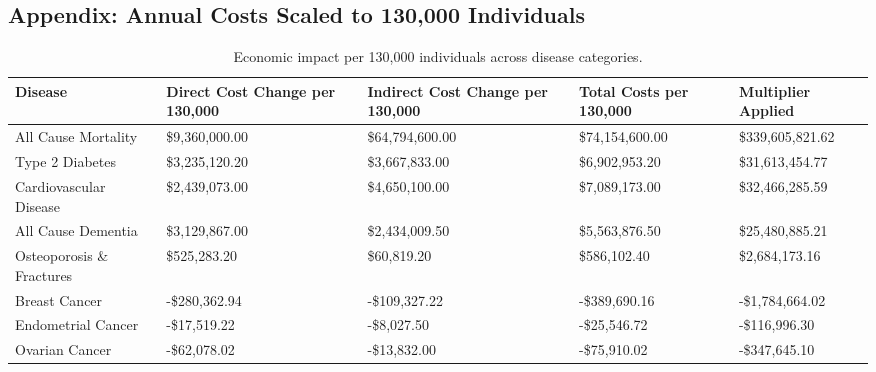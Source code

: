 \documentclass[12pt]{article}
\begin{document}
\begin{landscape}
\section*{Appendix: Annual Costs Scaled to 130,000 Individuals}
\begin{table}[h]
\centering
\small
\begin{tabular}{|p{3.5cm}|p{2.8cm}|p{2.8cm}|p{2.8cm}|p{3.2cm}|}
\hline
\textbf{Disease} & \textbf{Direct Cost Change per 130,000} & \textbf{Indirect Cost Change per 130,000} & \textbf{Total Costs per 130,000} & \textbf{Multiplier Applied} \\
\hline
All Cause Mortality & \$9,360,000.00 & \$64,794,600.00 & \$74,154,600.00 & \$339,605,821.62 \\
\hline
Type 2 Diabetes & \$3,235,120.20 & \$3,667,833.00 & \$6,902,953.20 & \$31,613,454.77 \\
\hline
Cardiovascular Disease & \$2,439,073.00 & \$4,650,100.00 & \$7,089,173.00 & \$32,466,285.59 \\
\hline
All Cause Dementia & \$3,129,867.00 & \$2,434,009.50 & \$5,563,876.50 & \$25,480,885.21 \\
\hline
Osteoporosis \& Fractures & \$525,283.20 & \$60,819.20 & \$586,102.40 & \$2,684,173.16 \\
\hline
Breast Cancer & -\$280,362.94 & -\$109,327.22 & -\$389,690.16 & -\$1,784,664.02 \\
\hline
Endometrial Cancer & -\$17,519.22 & -\$8,027.50 & -\$25,546.72 & -\$116,996.30 \\
\hline
Ovarian Cancer & -\$62,078.02 & -\$13,832.00 & -\$75,910.02 & -\$347,645.10 \\
\hline
\end{tabular}
\caption{Economic impact per 130,000 individuals across disease categories.}
\label{tab:scaled_costs_130k}
\end{table}

\end{landscape}

\printbibliography
\end{document}
